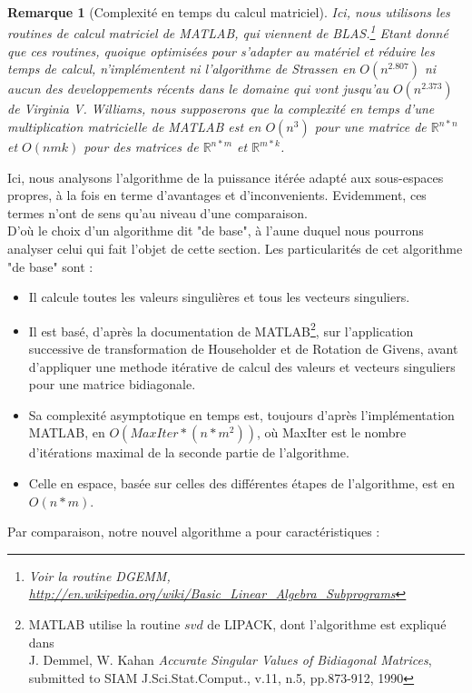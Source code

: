 \documentclass[a4paper,12pt]{article}
\newtheorem*{remark}{Remarque}
\begin{document}
    \begin{remark}[Complexité en temps du calcul matriciel]
    Ici, nous utilisons les routines de calcul matriciel de MATLAB, qui viennent de BLAS.\footnote{Voir la routine DGEMM, \url{http://en.wikipedia.org/wiki/Basic_Linear_Algebra_Subprograms}} Etant donné que ces routines, quoique optimisées pour s'adapter au matériel et réduire les temps de calcul, n'implémentent ni l'algorithme de Strassen en $O(n^{2.807})$ ni aucun des developpements récents dans le domaine qui vont jusqu'au $O(n^{2.373})$ de Virginia V. Williams, nous supposerons que la complexité en temps d'une multiplication matricielle de MATLAB est en $O(n^3)$ pour une matrice de $\mathbb{R}^{n*n}$ et $O(nmk)$ pour des matrices de $\mathbb{R}^{n*m}$ et $\mathbb{R}^{m*k}$.
    \end{remark}

    Ici, nous analysons l'algorithme de la puissance itérée adapté aux sous-espaces propres, à la fois en terme d'avantages et d'inconvenients. Evidemment, ces termes n'ont de sens qu'au niveau d'une comparaison. \\
    D'où le choix d'un algorithme dit "de base", à l'aune duquel nous pourrons analyser celui qui fait l'objet de cette section.
    Les particularités de cet algorithme "de base" sont : \\

        \begin{itemize}
            \item Il calcule toutes les valeurs singulières et tous les vecteurs singuliers.
            \item Il est basé, d'après la documentation de MATLAB\footnote{MATLAB utilise la routine $svd$ de LIPACK, dont l'algorithme est expliqué dans \\    J. Demmel, W. Kahan \textit{Accurate Singular Values of Bidiagonal Matrices}, submitted to SIAM J.Sci.Stat.Comput., v.11, n.5, pp.873-912, 1990}, sur l'application successive de transformation de Householder et de Rotation de Givens, avant d'appliquer une methode itérative de calcul des valeurs et vecteurs singuliers pour une matrice bidiagonale.
            \item Sa complexité asymptotique en temps est, toujours d'après l'implémentation MATLAB, en $O(MaxIter*(n*m^2))$, où MaxIter est le nombre d'itérations maximal de la seconde partie de l'algorithme.
            \item Celle en espace, basée sur celles des différentes étapes de l'algorithme, est en $O(n*m)$.
        \end{itemize}
\bigskip
    Par comparaison, notre nouvel algorithme a pour caractéristiques : \\
\end{document}
